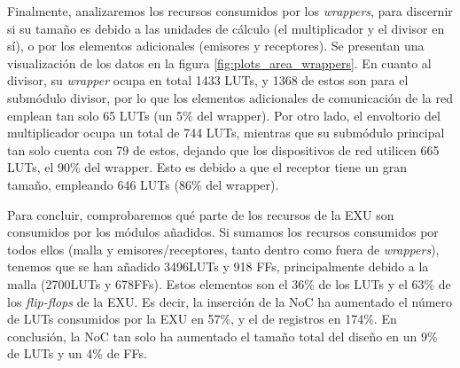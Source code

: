 Finalmente, analizaremos los recursos consumidos por los \textit{wrappers}, para discernir si su tamaño es debido a las unidades de cálculo (el multiplicador y el divisor en sí), o por los elementos adicionales (emisores y receptores). Se presentan una visualización de los datos en la figura \ref{fig:plots_area_wrappers}. En cuanto al divisor, su \textit{wrapper} ocupa en total 1433 LUTs, y 1368 de estos son para el submódulo divisor, por lo que los elementos adicionales de comunicación de la red emplean tan solo 65 LUTs (un 5\% del wrapper). Por otro lado, el envoltorio del multiplicador ocupa un total de 744 LUTs, mientras que su submódulo principal tan solo cuenta con 79 de estos, dejando que los dispositivos de red utilicen 665 LUTs, el 90\% del wrapper. Esto es debido a que el receptor tiene un gran tamaño, empleando 646 LUTs (86\% del wrapper).

Para concluir, comprobaremos qué parte de los recursos de la  EXU son consumidos por los módulos añadidos. Si sumamos los recursos consumidos por todos ellos (malla y emisores/receptores, tanto dentro como fuera de \textit{wrappers}), tenemos que se han añadido 3496LUTs y 918 FFs, principalmente debido a la malla (2700LUTs y 678FFs). Estos elementos son el 36\% de los LUTs y el 63\% de los \textit{flip-flops} de la EXU. Es decir, la inserción de la NoC ha aumentado el número de LUTs consumidos por la EXU en 57\%, y el de registros en 174\%. En conclusión, la NoC tan solo ha aumentado el tamaño total del diseño en un 9\% de LUTs y un 4\% de FFs.


